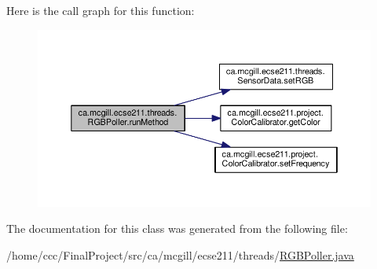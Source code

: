 Here is the call graph for this function\+:\nopagebreak
\begin{figure}[H]
\begin{center}
\leavevmode
\includegraphics[width=350pt]{classca_1_1mcgill_1_1ecse211_1_1threads_1_1_r_g_b_poller_a96db4561c87136de5098497fe30356fe_cgraph}
\end{center}
\end{figure}


The documentation for this class was generated from the following file\+:\begin{DoxyCompactItemize}
\item 
/home/ccc/\+Final\+Project/src/ca/mcgill/ecse211/threads/\hyperlink{_r_g_b_poller_8java}{R\+G\+B\+Poller.\+java}\end{DoxyCompactItemize}
